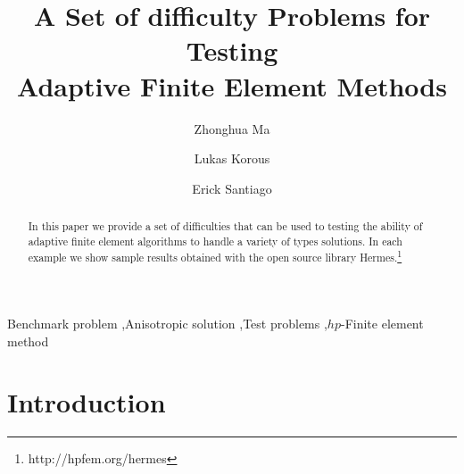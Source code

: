 \documentclass[12pt]{elsarticle}
\begin{document}
\begin{frontmatter}



\title{A Set of difficulty Problems for Testing\\ Adaptive Finite Element Methods}

\author[label1]{Zhonghua Ma}
\author[label2]{Lukas Korous}
\author[label3]{Erick Santiago}
\address[label1]{China University of Petroleum, Beijing, China}
\address[label2]{Charles University, Prague, Czech Republic}
\address[label3]{University of Nevada, Reno, USA}

\begin{abstract}
In this paper we provide a set of difficulties that can be used to
testing the ability of adaptive finite element algorithms to handle
a variety of types solutions.
In each example we show sample results obtained with the
open source library {\sc Hermes}.\footnote{http://hpfem.org/hermes}
\end{abstract}

\begin{keyword}
Benchmark problem \sep Anisotropic solution \sep Test problems \sep $hp$-Finite element method
\end{keyword}

\end{frontmatter}


\section{Introduction}
\label{sec:intro}
\end{document}

